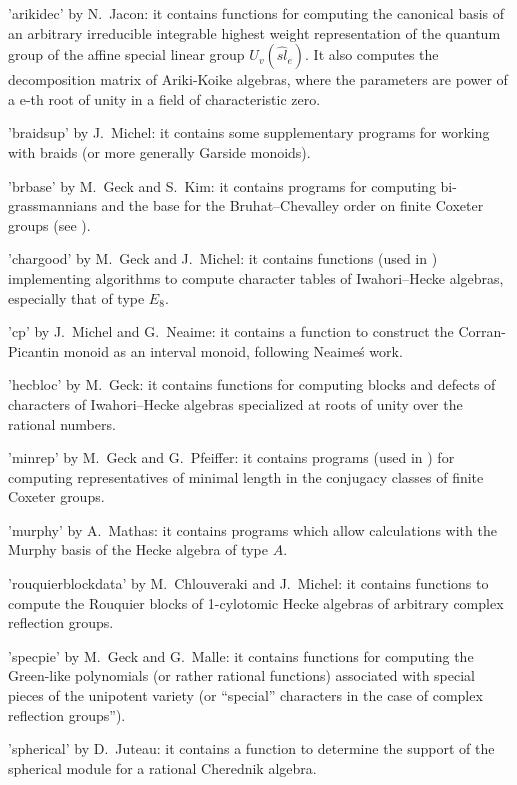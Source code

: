 'arikidec'  by N.~Jacon: it contains  functions for computing the canonical
basis  of an arbitrary irreducible integrable highest weight representation
of   the  quantum   group  of   the  affine   special  linear   group  $U_v
(\widehat{sl}_e)$. It also computes the decomposition matrix of Ariki-Koike
algebras, where the parameters are power of a e-th root of unity in a field
of characteristic zero.

'braidsup'  by  J.~Michel:  it  contains  some  supplementary  programs for
working with braids (or more generally Garside monoids).

'brbase'  by  M.~Geck  and  S.~Kim:  it  contains  programs  for  computing
bi-grassmannians  and the  base for  the Bruhat--Chevalley  order on finite
Coxeter groups (see \cite{GK96}).

'chargood'  by  M.~Geck  and  J.~Michel:  it  contains  functions  (used in
\cite{GM97})   implementing  algorithms  to  compute  character  tables  of
Iwahori--Hecke algebras, especially that of type $E_8$.

'cp'  by J.~Michel and  G.~Neaime: it contains  a function to construct the
Corran-Picantin monoid as an interval monoid, following Neaime\'s work.

'hecbloc'  by  M.~Geck:  it  contains  functions  for  computing blocks and
defects  of characters of  Iwahori--Hecke algebras specialized  at roots of
unity over the rational numbers.

'minrep'  by  M.~Geck  and  G.~Pfeiffer:  it  contains  programs  (used  in
\cite{GP93})  for  computing  representatives  of  minimal  length  in  the
conjugacy classes of finite Coxeter groups.

'murphy'  by A.~Mathas: it contains  programs which allow calculations with
the Murphy basis of the Hecke algebra of type $A$.

'rouquierblockdata'  by M.~Chlouveraki and J.~Michel: it contains functions
to  compute the Rouquier blocks of  1-cylotomic Hecke algebras of arbitrary
complex reflection groups.

'specpie'  by M.~Geck and G.~Malle: it contains functions for computing the
Green-like  polynomials  (or  rather  rational  functions)  associated with
special  pieces of the unipotent variety  (or ``special'' characters in the
case of complex reflection groups'').

'spherical'  by D.~Juteau: it contains a  function to determine the support
of the spherical module for a rational Cherednik algebra.

